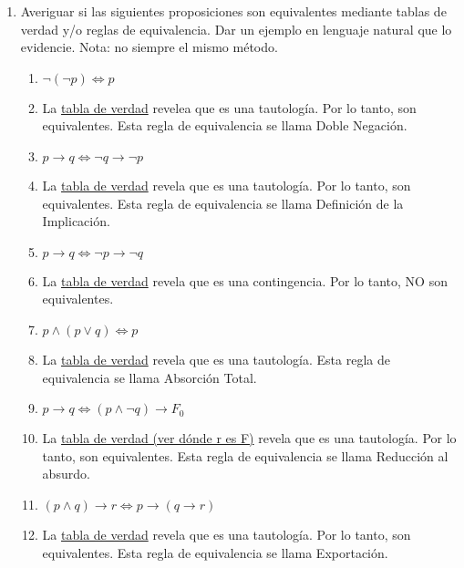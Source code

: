 \documentclass[a4paper]{article}
\newcommand{\answer}{\item[**]}
\newcommand{\exercise}{\item}
\newcommand{\then}{\to}
\newcommand{\Eq}{\Leftrightarrow}
\begin{document}
\begin{enumerate}
\begin{multicols}{2}
\begin{enumerate} [label=(\alph*)]
	\end{enumerate}
	\end{multicols}

	\exercise Averiguar si las siguientes proposiciones son equivalentes mediante tablas de verdad y/o reglas de equivalencia.  Dar un ejemplo en lenguaje natural que lo evidencie. Nota: no siempre el mismo método.
	\begin{multicols}{2}
	\begin{enumerate} [label=(\alph*)]

		\item $\neg (\neg p) \Eq  p$
		\answer La \href{https://www.wolframalpha.com/input?i=truth+table%3A+not+%28not+p%29+%3C%3D%3E+p}{tabla de verdad} revelea que es una tautología. Por lo tanto, son equivalentes. Esta regla de equivalencia se llama Doble Negación.

		\item $p\then q \Eq \neg q\then \neg p$
		\answer La \href{https://www.wolframalpha.com/input?i=%28p+%3D%3E+q%29+%3C%3D%3E+not+q+%3D%3E+not+p}{tabla de verdad} revela que es una tautología. Por lo tanto, son equivalentes. Esta regla de equivalencia se llama Definición de la Implicación.

		\item $p\then q \Eq \neg p\then \neg q$
		\answer La \href{https://www.wolframalpha.com/input?i=%28p+%3D%3E+q%29+%3C%3D%3E+%28not+p+%3D%3E+not+q%29}{tabla de verdad} revela que es una contingencia. Por lo tanto, NO son equivalentes.

		\item $p \land  (p \lor  q) \Eq  p$
		\answer La \href{https://www.wolframalpha.com/input?i=%28p+and+%28p+or++q%29%29+%3C%3D%3E++p}{tabla de verdad} revela que es una tautología. Esta regla de equivalencia se llama Absorción Total.

		\item $p\then q	\Eq (p \land  \neg q)\then F_0$
		\answer La \href{https://www.wolframalpha.com/input?i=%28p+%3D%3E+q%29+%3C%3D%3E+%28%28p+and+not+q%29+%3D%3E+r%29}{tabla de verdad (ver dónde r es F)} revela que es una tautología. Por lo tanto, son equivalentes. Esta regla de equivalencia se llama Reducción al absurdo.

		\item $(p\land q)\then r \Eq p\then (q\then r) $
		\answer La \href{https://www.wolframalpha.com/input?i=%28%28p+and+q%29+%3D%3E+r%29%3C%3D%3E+%28p+%3D%3E+%28q+%3D%3Er%29%29}{tabla de verdad} revela que es una tautología. Por lo tanto, son equivalentes. Esta regla de equivalencia se llama Exportación.


\end{enumerate}
\end{multicols}
\end{enumerate}
\end{document}
